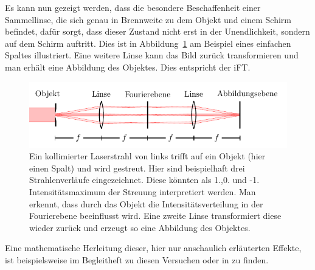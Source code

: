Es kann nun gezeigt werden, dass die besondere Beschaffenheit einer Sammellinse, die sich genau in Brennweite zu dem Objekt und einem Schirm befindet, dafür sorgt, dass dieser Zustand nicht erst in der Unendlichkeit, sondern auf dem Schirm auftritt. Dies ist in Abbildung~\ref{fig:ft-an-linse} am Beispiel eines einfachen Spaltes illustriert. Eine weitere Linse kann das Bild zurück transformieren und man erhält eine Abbildung des Objektes. Dies entspricht der iFT.

\begin{figure}[h]
	\centering
	\includegraphics[scale=1]{graphs/theorie/abbildung.pdf}
	\caption[Illustration: Inverse und Fouriertransformation an Linsen]{
		Ein kollimierter Laserstrahl von links trifft auf ein Objekt (hier einen Spalt) und wird gestreut. Hier sind beispielhaft drei Strahlenverläufe eingezeichnet. Diese könnten als 1.,0. und -1. Intensitätsmaximum der Streuung interpretiert werden. Man erkennt, dass durch das Objekt die Intensitätsverteilung in der Fourierebene beeinflusst wird. Eine zweite Linse transformiert diese wieder zurück und erzeugt so eine Abbildung des Objektes.
	} \label{fig:ft-an-linse}
\end{figure}


Eine mathematische Herleitung dieser, hier nur anschaulich erläuterten Effekte, ist beispielsweise im Begleitheft zu diesen Versuchen oder in\cite[Kap. 2.3]{stossel_fourieroptik:_1993} zu finden.


